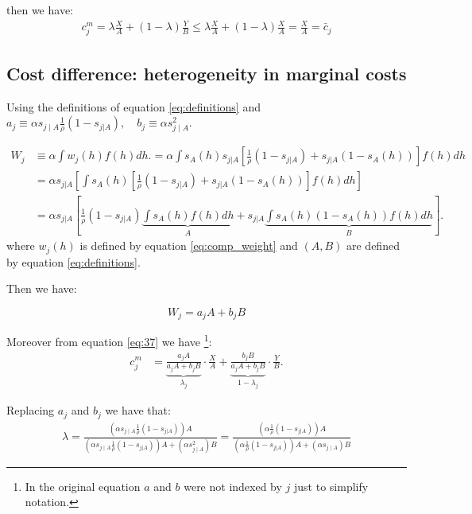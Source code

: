 \documentclass[12pt]{article}
\theoremstyle{plain}
\theoremstyle{plain}
\begin{document}
then we have: 
 \begin{align}
    c^m_j = \lambda \frac{X}{A} + (1-\lambda)\frac{Y}{B} \leq  \lambda \frac{X}{A} + (1-\lambda)\frac{X}{A} = \frac{X}{A} =\bar{c}_j 
\end{align}

\bigskip

\subsection{Cost difference: heterogeneity in marginal costs}\label{sec:appendix3.1}

Using the definitions of equation \ref{eq:definitions} and  $a_j \equiv  \alpha s_{j\mid A} \frac{1}{\rho}(1-s_{j|A}), \quad b_j \equiv \alpha s_{j\mid A}^2 $. 


\begin{align}\label{eq:3.6.1}
W_j & \equiv \alpha \int w_j(h) f(h) dh. = \alpha \int s_A(h) s_{j|A} \left[ \frac{1}{\rho}(1-s_{j|A}) + s_{j|A}(1-s_A(h)) \right] f(h) dh \\
 &= \alpha s_{j|A}\left[ \int s_A(h)   \left[ \frac{1}{\rho}(1-s_{j|A}) + s_{j|A}(1-s_A(h)) \right] f(h) dh \right] \\
&= \alpha s_{j|A} \left[ \frac{1}{\rho}(1-s_{j|A}) \underbrace{\int s_A(h) f(h) dh}_{A} + s_{j|A} \underbrace{\int s_A(h)(1-s_A(h)) f(h) dh}_{B} \right].
\end{align}
where $w_j(h)$ is defined by equation \ref{eq:comp_weight} and $(A,B)$ are defined by equation \ref{eq:definitions}. 

Then we have: 

\begin{equation}
W_j = a_j A + b_j B
\end{equation}

Moreover from equation \ref{eq:37} we have \footnote{In the original equation $a$ and $b$ were not indexed by $j$ just to simplify notation.}:
 \begin{align}\label{eq:mgcost_convex}
    c^m_j 
    &=  \underbrace{\frac{a_jA}{a_jA+b_jB}}_{\lambda_j}\cdot\frac{X}{A} + \underbrace{\frac{b_jB}{a_jA+b_jB}}_{1-\lambda_j}\cdot\frac{Y}{B}.
\end{align}

Replacing $a_j$ and $b_j$ we have that: 
\begin{align}\label{eq:46}
    \lambda = \frac{\left(\alpha s_{j\mid A} \frac{1}{\rho}(1-s_{j|A})\right)A}{\left(\alpha s_{j\mid A} \frac{1}{\rho}(1-s_{j|A})\right)A+\left(\alpha s_{j\mid A}^2\right)B}  = \frac{\left(\alpha  \frac{1}{\rho}(1-s_{j|A})\right)A}{\left(\alpha  \frac{1}{\rho}(1-s_{j|A})\right)A+\left(\alpha s_{j\mid A}\right)B} 
\end{align}
\end{document}
